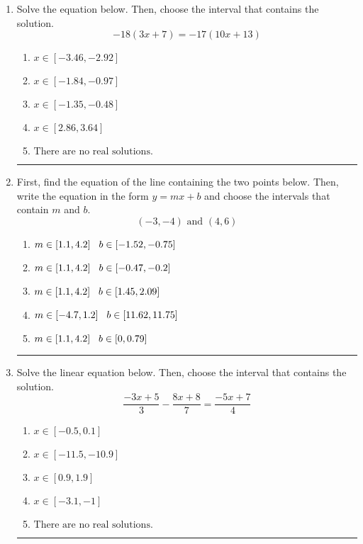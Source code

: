 \documentclass[14pt]{extbook}
\newcommand{\litem}[1]{\item#1\hspace*{-1cm}\rule{\textwidth}{0.4pt}}
\begin{document}
\begin{enumerate}
{\begin{enumerate}[label=\Alph*.]
\end{enumerate} }
\litem{
Solve the equation below. Then, choose the interval that contains the solution.\[ -18(3x + 7) = -17(10x + 13) \]\begin{enumerate}[label=\Alph*.]
\item \( x \in [-3.46, -2.92] \)
\item \( x \in [-1.84, -0.97] \)
\item \( x \in [-1.35, -0.48] \)
\item \( x \in [2.86, 3.64] \)
\item \( \text{There are no real solutions.} \)

\end{enumerate} }
\litem{
First, find the equation of the line containing the two points below. Then, write the equation in the form $ y=mx+b $ and choose the intervals that contain $m$ and $b$.\[ (-3, -4) \text{ and } (4, 6) \]\begin{enumerate}[label=\Alph*.]
\item \( m \in [1.1, 4.2] \hspace*{3mm} b \in [-1.52, -0.75] \)
\item \( m \in [1.1, 4.2] \hspace*{3mm} b \in [-0.47, -0.2] \)
\item \( m \in [1.1, 4.2] \hspace*{3mm} b \in [1.45, 2.09] \)
\item \( m \in [-4.7, 1.2] \hspace*{3mm} b \in [11.62, 11.75] \)
\item \( m \in [1.1, 4.2] \hspace*{3mm} b \in [0, 0.79] \)

\end{enumerate} }
\litem{
Solve the linear equation below. Then, choose the interval that contains the solution.\[ \frac{-3x + 5}{3} - \frac{8x + 8}{7} = \frac{-5x + 7}{4} \]\begin{enumerate}[label=\Alph*.]
\item \( x \in [-0.5, 0.1] \)
\item \( x \in [-11.5, -10.9] \)
\item \( x \in [0.9, 1.9] \)
\item \( x \in [-3.1, -1] \)
\item \( \text{There are no real solutions.} \)

\end{enumerate} }
\end{enumerate}
\end{document}
